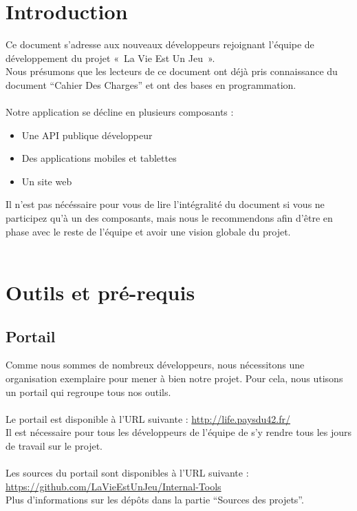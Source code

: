 \documentclass{life-fr}
\begin{document}
\newpage

\tableofcontents


\chapter{Introduction}

Ce document s'adresse aux nouveaux développeurs rejoignant l'équipe de
développement du projet «~La Vie Est Un Jeu~».\\
Nous présumons que les lecteurs de ce document ont déjà pris connaissance
du document ``Cahier Des Charges'' et ont des bases en programmation.\\
\\
Notre application se décline en plusieurs composants :
\begin{itemize}
  \item Une API publique développeur
  \item Des applications mobiles et tablettes
  \item Un site web
\end{itemize}
Il n'est pas nécéssaire pour vous de lire l'intégralité du document
si vous ne participez qu'à un des composants, mais nous le recommendons
afin d'être en phase avec le reste de l'équipe et avoir une vision globale
du projet.\\
\\


\chapter{Outils et pré-requis}

\section{Portail}

Comme nous sommes de nombreux développeurs, nous nécessitons une organisation
exemplaire pour mener à bien notre projet. Pour cela, nous utisons un portail
qui regroupe tous nos outils.\\
\\
Le portail est disponible à l'URL suivante :
\url{http://life.paysdu42.fr/}\\
Il est nécessaire pour tous les développeurs de l'équipe de s'y rendre tous
les jours de travail sur le projet.\\
\\
Les sources du portail sont disponibles à l'URL suivante :
\url{https://github.com/LaVieEstUnJeu/Internal-Tools}\\
Plus d'informations sur les dépôts dans la partie ``Sources des projets''.
\end{document}

